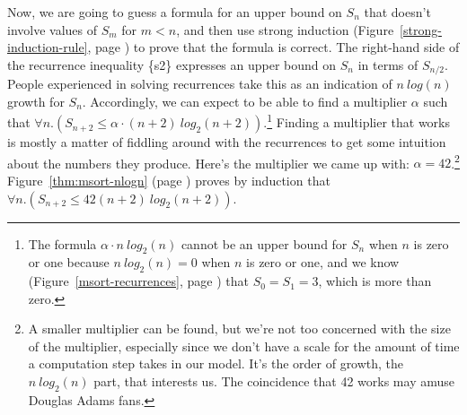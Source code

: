 Now, we are going to guess a formula for an upper bound on $S_n$
that doesn't involve values of $S_m$ for $m < n$,
and then use strong induction
(Figure~\ref{strong-induction-rule}, page \pageref{strong-induction-rule})
to prove that the formula is correct.
The right-hand side of the recurrence inequality \{s2\} expresses
an upper bound on $S_n$ in terms of $S_{n/2}$.
People experienced in solving recurrences take this as an
indication of $n~log(n)$ growth for $S_n$.
Accordingly, we can expect to be able to find a multiplier $\alpha$ such that
$\forall n.(S_{n+2} \leq \alpha \cdot (n+2)~log_2(n+2))$.\footnote{The
formula $\alpha\cdot n~log_2(n)$ cannot be an upper bound for $S_n$
when $n$ is zero or one because $n~log_2(n) = 0$ when $n$ is zero or one,
and we know
(Figure~\ref{msort-recurrences}, page \pageref{msort-recurrences})
that $S_0 = S_1 = 3$, which is more than zero.}
Finding a multiplier that works is mostly a matter of
fiddling around with the recurrences to get some intuition
about the numbers they produce.
Here's the multiplier we came up with: $\alpha = 42$.\footnote{A
smaller multiplier can be found, but
we're not too concerned with the size of the multiplier,
especially since we don't have a scale for the amount of time
a computation step takes in our model.
It's the order of growth, the $n~log_2(n)$ part, that interests us.
The coincidence that 42 works may amuse Douglas Adams fans.}
Figure~\ref{thm:msort-nlogn} (page \pageref{thm:msort-nlogn})
proves by induction that
$\forall n.(S_{n+2} \leq 42(n+2)~log_2(n+2))$.

